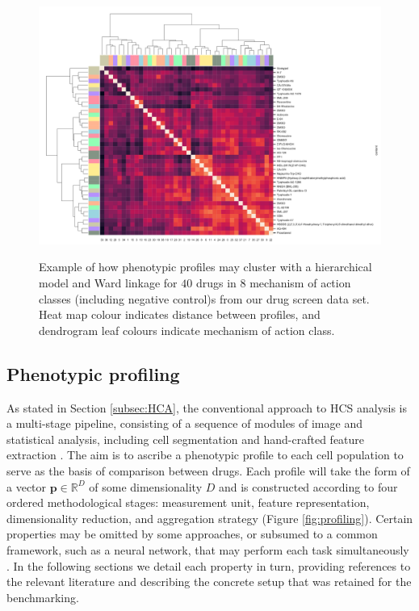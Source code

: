 \begin{figure}[ht]
\centering
\includegraphics[width=\textwidth]{img/clustermap.pdf}
\label{fig:clustermap}
\caption{Example of how phenotypic profiles may cluster with a hierarchical model and Ward linkage for $40$ drugs in $8$ mechanism of action classes (including negative control)s from our drug screen data set. Heat map colour indicates distance between profiles, and dendrogram leaf colours indicate mechanism of action class.}
\end{figure}

\subsection{Phenotypic profiling}

As stated in Section \ref{subsec:HCA}, the conventional approach to HCS analysis is a multi-stage pipeline, consisting of a sequence of modules of image and statistical analysis, including cell segmentation and hand-crafted feature extraction {\cite{Caicedo2017}}. The aim is to ascribe a phenotypic profile to each cell population to serve as the basis of comparison between drugs. Each profile will take the form of a vector $\mathbf{p} \in \mathbb{R}^D$ of some dimensionality $D$ and is constructed according to four ordered methodological stages: measurement unit, feature representation, dimensionality reduction, and aggregation strategy (Figure \ref{fig:profiling}). Certain properties may be omitted by some approaches, or subsumed to a common framework, such as a neural network, that may perform each task simultaneously \cite{kraus2016classifying,godinez2017multi}. In the following sections we detail each property in turn, providing references to the relevant literature and describing the concrete setup that was retained for the benchmarking.

